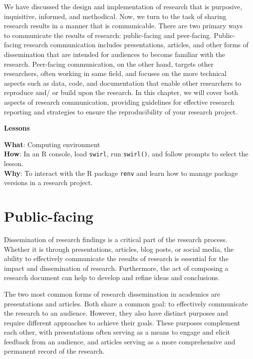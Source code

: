 \documentclass[
  letterpaper,
]{latex/krantz}
\theoremstyle{definition}
\theoremstyle{remark}
\begin{document}
We have discussed the design and implementation of research that is
purposive, inquisitive, informed, and methodical. Now, we turn to the
task of sharing research results in a manner that is communicable. There
are two primary ways to communicate the results of research:
public-facing and peer-facing. Public-facing research communication
includes presentations, articles, and other forms of dissemination that
are intended for audiences to become familiar with the research.
Peer-facing communication, on the other hand, targets other researchers,
often working in same field, and focuses on the more technical aspects
such as data, code, and documentation that enable other researchers to
reproduce and/ or build upon the research. In this chapter, we will
cover both aspects of research communication, providing guidelines for
effective research reporting and strategies to ensure the
reproducibility of your research project.

\begin{tcolorbox}[enhanced jigsaw, breakable, leftrule=.75mm, arc=.35mm, colframe=quarto-callout-color-frame, colback=white, left=2mm, bottomrule=.15mm, rightrule=.15mm, toprule=.15mm, opacityback=0]

\textbf{ Lessons}

\textbf{What}: Computing environment\\
\textbf{How}: In an R console, load \texttt{swirl}, run
\texttt{swirl()}, and follow prompts to select the lesson.\\
\textbf{Why}: To interact with the R package \texttt{renv} and learn how
to manage package versions in a research project.

\end{tcolorbox}

\section{Public-facing}\label{sec-contr-public-facing}

Dissemination of research findings is a critical part of the research
process. Whether it is through presentations, articles, blog posts, or
social media, the ability to effectively communicate the results of
research is essential for the impact and dissemination of research.
Furthermore, the act of composing a research document can help to
develop and refine ideas and conclusions.

The two most common forms of research dissemination in academics are
presentations and articles. Both share a common goal: to effectively
communicate the research to an audience. However, they also have
distinct purposes and require different approaches to achieve their
goals. These purposes complement each other, with presentations often
serving as a means to engage and elicit feedback from an audience, and
articles serving as a more comprehensive and permanent record of the
research.
\end{document}

